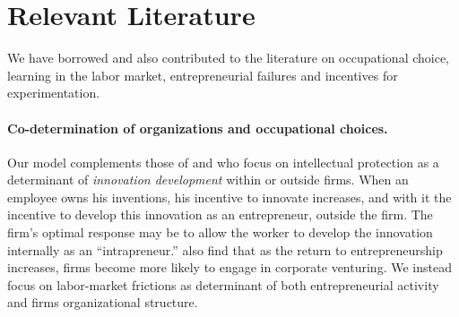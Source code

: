 \documentclass[12pt,american]{paper}
\theoremstyle{remark}
\begin{document}
\section{Relevant Literature}

We have borrowed and also contributed to the literature on occupational choice, learning in the labor market, entrepreneurial failures and incentives for experimentation.

\paragraph{Co-determination of organizations and occupational choices.} 



Our model complements those of \cite{Hellmann:2007tk} and \cite{de2008corporate} who focus on intellectual protection as a determinant of \textit{innovation development} within or outside firms. When an employee owns his  inventions, his incentive to innovate increases, and with it the incentive to develop this innovation as an entrepreneur, outside the firm.  The firm's optimal response may be to allow the worker to develop the innovation internally as an ``intrapreneur.'' \citet{de2008corporate} also find that as the return to entrepreneurship increases, firms become more likely to engage in corporate venturing. We instead focus on labor-market frictions as determinant of both entrepreneurial activity and firms organizational structure.
\end{document}
